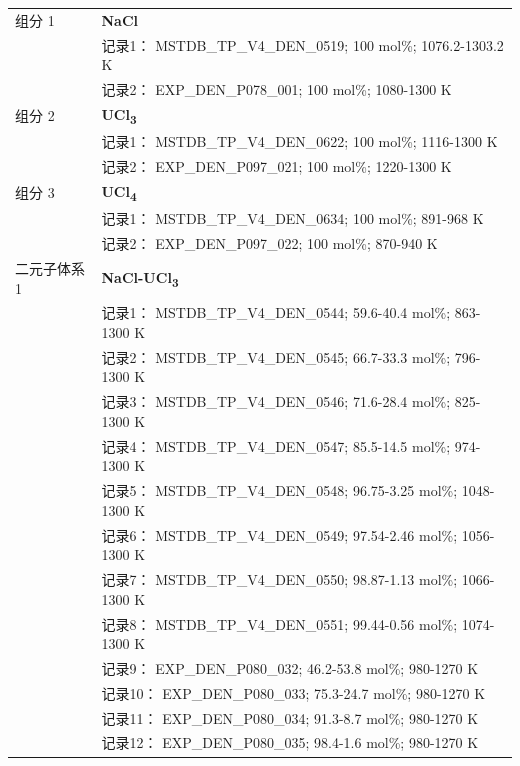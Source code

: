 \documentclass[12pt]{article}
\begin{document}
{\begin{longtable}[]{@{}
  >{\raggedright\arraybackslash}p{}
  >{\raggedright\arraybackslash}p{}@{}}
组分 1  & \textbf{NaCl} \\
 & 记录1： MSTDB\_TP\_V4\_DEN\_0519; 100 mol\%; 1076.2-1303.2 K \\
 & 记录2： EXP\_DEN\_P078\_001; 100 mol\%; 1080-1300 K  \\

组分 2  & \textbf{UCl\textsubscript{3}} \\
 & 记录1： MSTDB\_TP\_V4\_DEN\_0622; 100 mol\%; 1116-1300 K \\
 & 记录2： EXP\_DEN\_P097\_021; 100 mol\%; 1220-1300 K  \\

组分 3  & \textbf{UCl\textsubscript{4}} \\
 & 记录1： MSTDB\_TP\_V4\_DEN\_0634; 100 mol\%; 891-968 K \\
 & 记录2： EXP\_DEN\_P097\_022; 100 mol\%; 870-940 K  \\

二元子体系 1  & \textbf{NaCl-UCl\textsubscript{3}} \\
 & 记录1： MSTDB\_TP\_V4\_DEN\_0544; 59.6-40.4 mol\%; 863-1300 K \\
 & 记录2： MSTDB\_TP\_V4\_DEN\_0545; 66.7-33.3 mol\%; 796-1300 K \\
 & 记录3： MSTDB\_TP\_V4\_DEN\_0546; 71.6-28.4 mol\%; 825-1300 K \\
 & 记录4： MSTDB\_TP\_V4\_DEN\_0547; 85.5-14.5 mol\%; 974-1300 K \\
 & 记录5： MSTDB\_TP\_V4\_DEN\_0548; 96.75-3.25 mol\%; 1048-1300 K \\
 & 记录6： MSTDB\_TP\_V4\_DEN\_0549; 97.54-2.46 mol\%; 1056-1300 K \\
 & 记录7： MSTDB\_TP\_V4\_DEN\_0550; 98.87-1.13 mol\%; 1066-1300 K \\
 & 记录8： MSTDB\_TP\_V4\_DEN\_0551; 99.44-0.56 mol\%; 1074-1300 K \\
 & 记录9： EXP\_DEN\_P080\_032; 46.2-53.8 mol\%; 980-1270 K \\
 & 记录10： EXP\_DEN\_P080\_033; 75.3-24.7 mol\%; 980-1270 K \\
 & 记录11： EXP\_DEN\_P080\_034; 91.3-8.7 mol\%; 980-1270 K \\
 & 记录12： EXP\_DEN\_P080\_035; 98.4-1.6 mol\%; 980-1270 K  \\


\end{longtable}}
\end{document}

